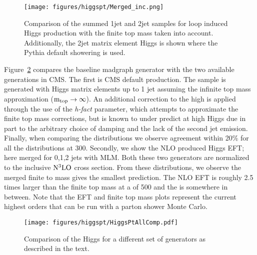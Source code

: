 \begin{figure}[hbtp]\begin{center}
    \texttt{[image: figures/higgspt/Merged\_inc.png]}
    \caption{Comparison of the summed 1jet and 2jet samples for loop induced Higgs production with the finite top mass taken into account. Additionally, the 2jet matrix element Higgs \pt is shown where the Pythia default showering is used.  }
 \label{fig:HiggsMerge}
 \end{center}
 \end{figure}

Figure~\ref{fig:Higgskfactor} compares the baseline madgraph generator with the two available generations in CMS. The first is CMS default \POWHEG production. The \POWHEG sample is generated with Higgs matrix elements up to 1 jet assuming the infinite top mass approximation (${\rm m_{top}}\rightarrow\infty$). An additional correction to the high \pt is applied through the use of the \emph{h-fact} parameter, which attempts to approximate the finite top mass corrections\cite{Bagnaschi:2015qta}, but is known to under predict at high Higgs \pt due in part to the arbitrary choice of damping and the lack of the second jet emission. Finally, when comparing the distributions we observe agreement within 20\% for all the distributions at 300\GeV. Secondly, we show the \MCATNLO NLO produced Higgs EFT; here merged for 0,1,2 jets with MLM. Both these two generators are normalized to the inclusive ${\rm N^{3}LO}$ cross section. From these distributions, we observe the merged finite to mass gives the smallest prediction. The NLO EFT is roughly 2.5 times larger than the finite top mass at a \pt of 500 \GeV and the \POWHEG is somewhere in between. Note that the EFT and finite top mass plots represent the current highest orders that can be run with a parton shower Monte Carlo. 

\begin{figure}[hbtp]\begin{center}
    \texttt{[image: figures/higgspt/HiggsPtAllComp.pdf]} 
    \caption{Comparison of the Higgs \pt for a different set of generators as described in the text.}
 \label{fig:Higgskfactor}
 \end{center}
 \end{figure}

